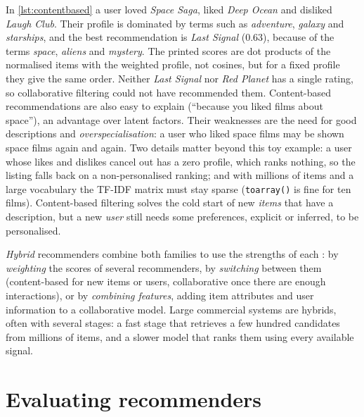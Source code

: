 In \cref{lst:contentbased} a user loved \emph{Space Saga}, liked \emph{Deep Ocean} and disliked \emph{Laugh Club}. Their profile
is dominated by terms such as \emph{adventure}, \emph{galaxy} and \emph{starships}, and the best recommendation is
\emph{Last Signal} (0.63), because of the terms \emph{space}, \emph{aliens} and \emph{mystery}. The printed scores are dot products of the normalised items with the weighted profile, not
cosines, but for a fixed profile they give the same order. Neither \emph{Last Signal}
nor \emph{Red Planet} has a single rating, so collaborative filtering could not have recommended them. Content-based
recommendations are also easy to explain (``because you liked films about space''), an advantage over latent factors.
Their weaknesses are the need for good descriptions and \emph{overspecialisation}: a user who liked space films may be shown
space films again and again. Two details matter beyond this toy example: a user whose likes and dislikes cancel out has a
zero profile, which ranks nothing, so the listing falls back on a non-personalised ranking; and with millions of items and
a large vocabulary the TF-IDF matrix must stay sparse (\texttt{toarray()} is fine for ten films). Content-based filtering
solves the cold start of new \emph{items} that have a description, but a new \emph{user} still needs some preferences,
explicit or inferred, to be personalised.

\emph{Hybrid} recommenders combine both families to use the strengths of each \citep{burke2002hybrid}: by \emph{weighting} the
scores of several recommenders, by \emph{switching} between them (content-based for new items or users, collaborative once
there are enough interactions), or by \emph{combining features}, adding item attributes and user information to a
collaborative model. Large commercial systems are hybrids, often with several stages: a fast stage that retrieves a few
hundred candidates from millions of items, and a slower model that ranks them using every available signal.

\section{Evaluating recommenders}\label{sec:receval}

